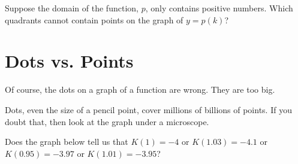 \documentclass{ximera}
\begin{document}
\begin{question}

Suppose the domain of the function, $p$, only contains positive numbers.  Which quadrants cannot contain points on the graph of $y=p(k)$?

\begin{selectAll}
\end{selectAll}

\end{question}






























\section*{Dots vs. Points}



Of course, the dots on a graph of a function are wrong. They are too big. 


Dots, even the size of a pencil point, cover millions of billions of points. If you doubt that, then look at the graph under a microscope.

Does the graph below tell us that $K(1) = -4$ or $K(1.03) = -4.1$ or $K(0.95) = -3.97$ or $K(1.01) = -3.95$?

\begin{image}
\end{image}
\end{document}
